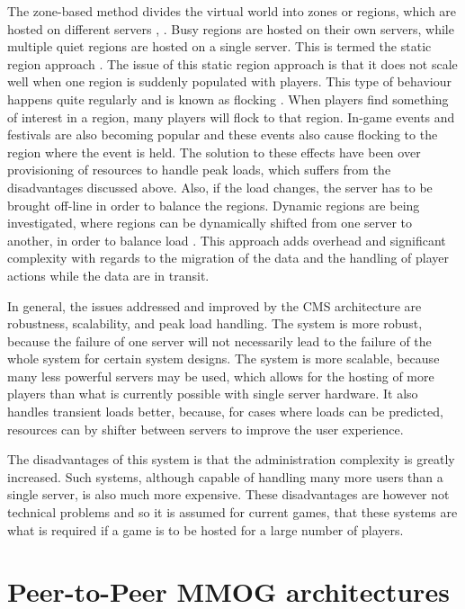 \documentclass[journal,oneside,a4paper,onecolumn]{IEEEtran}
\begin{document}
The zone-based method divides the virtual world into zones or regions, which are hosted on different servers \cite{zone_based_stat}, \cite{zone_based_dyn}. Busy regions are hosted on their own servers, while multiple quiet regions are hosted on a single server. This is termed the static region approach \cite{zone_based_stat}. The issue of this static region approach is that it does not scale well when one region is suddenly populated with players. This type of behaviour happens quite regularly and is known as flocking \cite{flocking}. When players find something of interest in a region, many players will flock to that region. In-game events and festivals are also becoming popular and these events also cause flocking to the region where the event is held. The solution to these effects have been over provisioning of resources to handle peak loads, which suffers from the disadvantages discussed above. Also, if the load changes, the server has to be brought off-line in order to balance the regions. Dynamic regions are being investigated, where regions can be dynamically shifted from one server to another, in order to balance load \cite{zone_based_dyn}. This approach adds overhead and significant complexity with regards to the migration of the data and the handling of player actions while the data are in transit.

In general, the issues addressed and improved by the \ac{CMS} architecture are robustness, scalability, and peak load handling. The system is more robust, because the failure of one server will not necessarily lead to the failure of the whole system for certain system designs. The system is more scalable, because many less powerful servers may be used, which allows for the hosting of more players than what is currently possible with single server hardware. It also handles transient loads better, because, for cases where loads can be predicted, resources can by shifter between servers to improve the user experience.

The disadvantages of this system is that the administration complexity is greatly increased. Such systems, although capable of handling many more users than a single server, is also much more expensive. These disadvantages are however not technical problems and so it is assumed for current games, that these systems are what is required if a game is to be hosted for a large number of players.

\section{Peer-to-Peer MMOG architectures}
\end{document}
